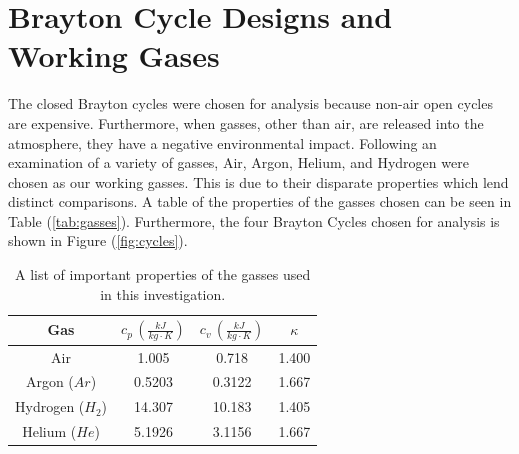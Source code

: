 \documentclass[
	12pt, %
]{brayton_cycle_report_style}
\begin{document}
\section{Brayton Cycle Designs and Working Gases}

The closed Brayton cycles were chosen for analysis because non-air open cycles are expensive. Furthermore, when gasses, other than air, are released into the atmosphere, they have a negative environmental impact. Following an examination of a variety of gasses, Air, Argon, Helium, and Hydrogen were chosen as our working gasses. This is due to their disparate properties which lend distinct comparisons. A table of the properties of the gasses chosen can be seen in Table (\ref{tab:gasses}). Furthermore, the four Brayton Cycles chosen for analysis is shown in Figure (\ref{fig:cycles}). 


\vspace{15mm}

\begin{table}[ht]
    \centering
    \caption{A list of important properties of the gasses used in this investigation.}
    \begin{tabular}{c|c|c|c}
        Gas & $c_{p} \, \left( \frac{kJ}{kg \cdot K} \right)$ & $c_{v} \, \left( \frac{kJ}{kg \cdot K} \right)$ & $\kappa$ \\
        \hline
        Air & 1.005 & 0.718 & 1.400 \\
        Argon ($Ar$) & 0.5203 & 0.3122 & 1.667 \\
        Hydrogen ($H_2$) & 14.307 & 10.183 & 1.405 \\
        Helium ($He$) & 5.1926 & 3.1156 & 1.667
        \label{tab:gasses}
    \end{tabular}
    \label{tab:my_label}
\end{table}
\end{document}
